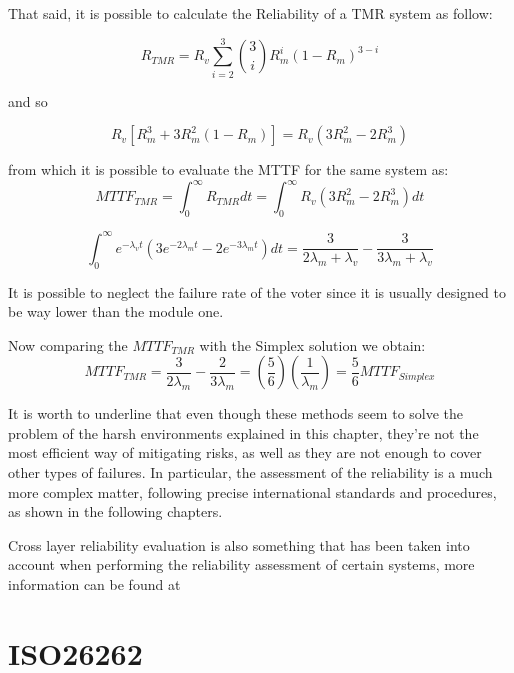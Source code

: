 \documentclass[./dissertation.tex]{subfiles}
\begin{document}
That said, it is possible to calculate the Reliability of a TMR system as follow:

\begin{equation}
    R_{TMR} = R_v \sum_{i=2}^{3} \binom{3}{i} R^i_m (1-R_m)^{3-i}
\end{equation}

and so 

\begin{equation}
    R_v [R_m^3 + 3R_m^2(1-R_m)] = R_v(3R^2_m - 2R_m^3)
\end{equation}

from which it is possible to evaluate the MTTF for the same system as:
\begin{equation}
MTTF_{TMR} = \int_0^{\infty}R_{TMR} dt = \int_0^{\infty}R_v (3R^2_m -2R^3_m)dt 
\end{equation}

\begin{equation}
\int_0^{\infty} e^{-\lambda_v t}\left( 3e^{-2\lambda_m t} -2e^{-3\lambda_m t}  \right) dt = \frac{3}{2\lambda_m + \lambda_v} - \frac{3}{3\lambda_m + \lambda_v}
\end{equation} 

It is possible to neglect the failure rate of the voter since it is usually designed to be way lower than the module one.

Now comparing the $MTTF_{TMR}$ with the Simplex solution we obtain:
\begin{equation}
    MTTF_{TMR} = \frac{3}{2\lambda_m} - \frac{2}{3\lambda_m} = \left( \frac{5}{6}\right) \left( \frac{1}{\lambda_m}\right) = \frac{5}{6} MTTF_{Simplex}
\end{equation}
\label{sec:iniziare}


It is worth to underline that even though these methods seem to solve the problem of the harsh environments explained in this chapter, they're not the most efficient way of mitigating risks, as well as they are not enough to cover other types of failures.
In particular, the assessment of the reliability is a much more complex matter, following precise international standards and procedures, as shown in the following chapters.

Cross layer reliability evaluation is also something that has been taken into account when performing the reliability assessment of certain systems, more information can be found at \cite{dinatale:hal-02986877}


\chapter{ISO26262}
\end{document}
